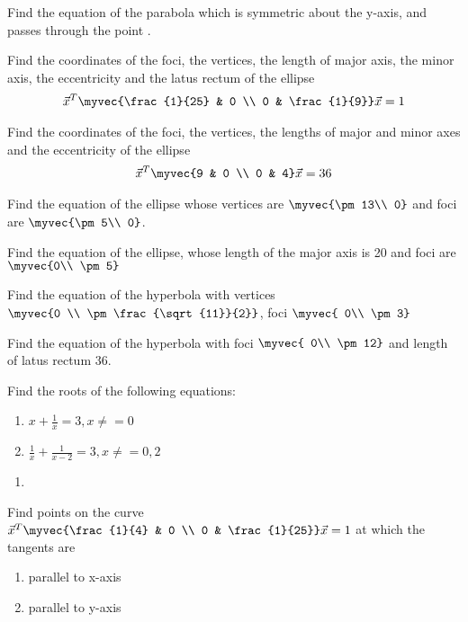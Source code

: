\item Find the equation of the parabola which is symmetric about the y-axis, and passes through the point .
\item Find the coordinates of the foci, the vertices, the length of major axis, the minor axis, the eccentricity and the latus rectum of the ellipse 
%
\begin{align}
\vec{x}^T\myvec{\frac{1}{25} & 0 \\ 0 & \frac{1}{9}}\vec{x} = 1
\end{align}
%
\item Find the coordinates of the foci, the vertices, the lengths of major and minor axes and the eccentricity of the ellipse 
%
\begin{align}
\vec{x}^T\myvec{9 & 0 \\ 0 & 4}\vec{x} = 36
\end{align}
%
\item Find the equation of the ellipse whose vertices are $\myvec{\pm 13\\ 0}$ and foci are $\myvec{\pm 5\\ 0}$.
%
\item Find the equation of the ellipse, whose length of the major axis is 20 and foci are $\myvec{0\\ \pm 5}$
%

\item Find the equation of the hyperbola with  vertices $\myvec{0 \\ \pm \frac{\sqrt{11}}{2}}$, foci $\myvec{ 0\\ \pm 3}$
\item Find the equation of the hyperbola with   foci $\myvec{ 0\\ \pm 12}$ and length of latus rectum 36.
%

\item Find the roots of the following equations:
\begin{enumerate}
\item  $x + \frac{1}{x} = 3, x \ne =0 $
\item  $ \frac{1}{x} + \frac{1}{x-2}=3, x\ne =0, 2 $
\end{enumerate}
%
\solution
\begin{enumerate}
\item 
\end{enumerate}


\item Find points on the curve 
$
\vec{x}^T\myvec{\frac{1}{4} & 0 \\ 0 & \frac{1}{25}}\vec{x} = 1
$
at which the tangents are 
\begin{enumerate}
\item parallel to x-axis
\item parallel to y-axis
\end{enumerate}
 
